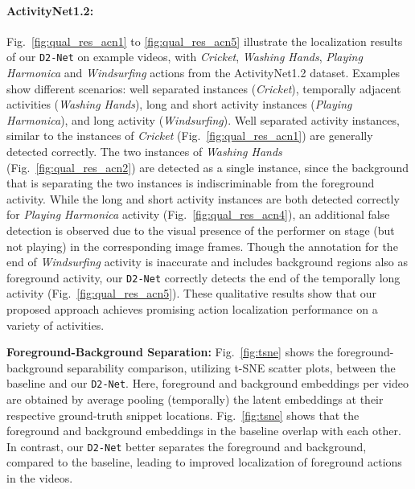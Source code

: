 \documentclass[10pt,twocolumn,letterpaper]{article}
\def\proposed{\texttt{D2-Net}{}}
\begin{document}
\paragraph{ActivityNet1.2:} Fig.~\ref{fig:qual_res_acn1} to \ref{fig:qual_res_acn5} illustrate the localization results of our \proposed{} on example videos, with \textit{Cricket}, \textit{Washing Hands}, \textit{Playing Harmonica} and \textit{Windsurfing} actions from the ActivityNet1.2 dataset. Examples show different scenarios: well separated instances (\textit{Cricket}), temporally adjacent activities (\textit{Washing Hands}), long and short activity instances (\textit{Playing Harmonica}), and long activity (\textit{Windsurfing}). Well separated activity instances, similar to the instances of \textit{Cricket} (Fig.~\ref{fig:qual_res_acn1}) are generally detected correctly. The two instances of \textit{Washing Hands} (Fig.~\ref{fig:qual_res_acn2}) are detected as a single instance, since the background that is separating the two instances is indiscriminable from the foreground activity. 
While the long and short activity instances are both detected correctly for \textit{Playing Harmonica} activity (Fig.~\ref{fig:qual_res_acn4}), an additional false detection is observed due to the visual presence of the performer on stage (but not playing) in the corresponding image frames. Though the annotation for the end of \textit{Windsurfing} activity is inaccurate and includes background regions also as foreground activity, our \proposed{} correctly detects the end of the temporally long activity (Fig.~\ref{fig:qual_res_acn5}). These qualitative results show that our proposed approach achieves promising action localization performance on a variety of activities. 
















\noindent\textbf{Foreground-Background Separation:}
Fig.~\ref{fig:tsne} shows the foreground-background separability comparison, utilizing t-SNE scatter plots, between the baseline and our \proposed{}. Here, foreground and background embeddings per video are obtained by average pooling (temporally) the latent embeddings at their respective ground-truth snippet locations. Fig.~\ref{fig:tsne} shows that the foreground and background embeddings in the baseline overlap with each other. In contrast, our \proposed{} better separates the foreground and background, compared to the baseline, leading to improved localization of foreground actions in the videos.  
\end{document}

